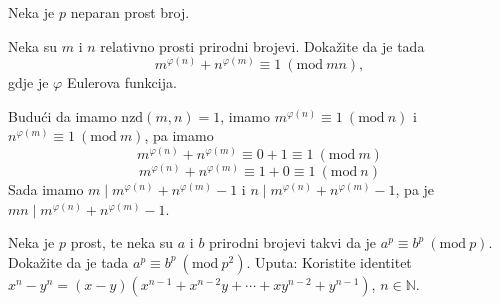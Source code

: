 \documentclass{exam}
\newcommand{\Mod}[1]{\ (\mathrm{mod}\ #1)}
\begin{document}
\begin{questions}
\question Neka je $p$ neparan prost broj.

\begin{solution}
\end{solution}

\question Neka su $m$ i $n$ relativno prosti prirodni brojevi. Dokažite da je tada
\[
  m^{\varphi(n)} + n^{\varphi(m)} \equiv 1 \Mod{mn},
\]
gdje je $\varphi$ Eulerova funkcija.

\begin{solution}
  Budući da imamo $\text{nzd}(m, n) = 1$, imamo $m^{\varphi(n)} \equiv 1 \Mod{n}$ i $n^{\varphi(m)} \equiv 1 \Mod{m}$, pa imamo
  \[
    m^{\varphi(n)} + n^{\varphi(m)} \equiv 0 + 1 \equiv 1 \Mod{m}
  \]
  \[
    m^{\varphi(n)} + n^{\varphi(m)} \equiv 1 + 0 \equiv 1 \Mod{n}
  \]
  Sada imamo $m \mid m^{\varphi(n)} + n^{\varphi(m)} - 1$ i $n \mid m^{\varphi(n)} + n^{\varphi(m)} - 1$, pa je $mn \mid m^{\varphi(n)} + n^{\varphi(m)} - 1$.
\end{solution}

\pagebreak

\question Neka je $p$ prost, te neka su $a$ i $b$ prirodni brojevi takvi da je $a^p \equiv b^p \Mod{p}$. Dokažite
da je tada $a^p \equiv b^p \Mod{p^2}$. \newline
Uputa: Koristite identitet $x^n - y^n = (x-y)(x^{n-1} +x^{n-2} y + \cdots +xy^{n-2} +y^{n-1})$, $n \in \mathbb{N}$.


\end{questions}
\end{document}
